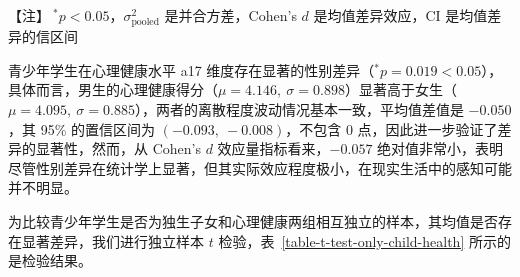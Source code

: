 \documentclass[zihao = -4, linespread = 1.5]{article}
\begin{document}
\begin{table}[htbp]
    \centering
    \setlength{\tabcolsep}{5pt}
    \renewcommand{\arraystretch}{1.5}
    \caption{学生性别与心理健康的独立性样本 $t$ 检验结果}\label{table-t-test-gender-health}
    \begin{threeparttable}
        \begin{tablenotes}\small
            \item 【注】$~^{\bm{*}}p < 0.05$，$\displaystyle\sigma^2_{\text{pooled}}$ 是并合方差，Cohen's $d$ 是均值差异效应，CI 是均值差异的信区间
        \end{tablenotes}
    \end{threeparttable}
\end{table}

青少年学生在心理健康水平 a17 维度存在显著的性别差异（$^{\bm{*}}p=0.019<0.05$），具体而言，男生的心理健康得分（$\mu=4.146,\ \sigma=0.898$）显著高于女生（$\mu=4.095,\ \sigma=0.885$），两者的离散程度波动情况基本一致，平均值差值是 $-0.050$，其 95\% 的置信区间为 $(-0.093,\ -0.008)$，不包含 0 点，因此进一步验证了差异的显著性，然而，从 Cohen's $d$ 效应量指标看来，$-0.057$ 绝对值非常小，表明尽管性别差异在统计学上显著，但其实际效应程度极小，在现实生活中的感知可能并不明显。

为比较青少年学生是否为独生子女和心理健康两组相互独立的样本，其均值是否存在显著差异，我们进行独立样本 $t$ 检验，表~\ref{table-t-test-only-child-health} 所示的是检验结果。
\end{document}

